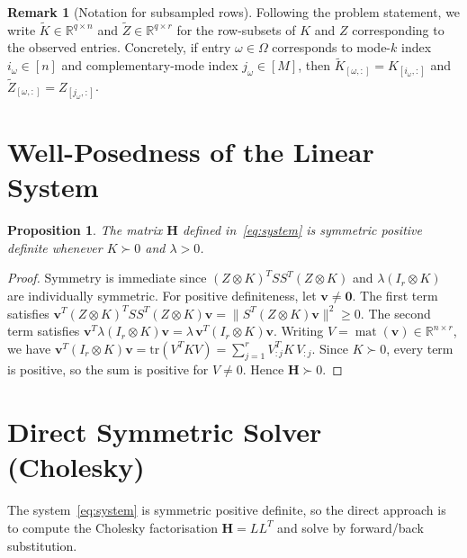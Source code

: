 \documentclass[12pt]{article}
\newtheorem{proposition}[theorem]{Proposition}
\theoremstyle{definition}
\newtheorem{remark}[theorem]{Remark}
\DeclareMathOperator{\mat}{mat}
\newcommand{\R}{\mathbb{R}}
\newcommand{\bH}{\mathbf{H}}
\newcommand{\bv}{\mathbf{v}}
\begin{document}
\begin{remark}[Notation for subsampled rows]
  Following the problem statement, we write $\widetilde{K}\in\R^{q\times n}$ and
  $\widetilde{Z}\in\R^{q\times r}$ for the row-subsets of $K$ and $Z$
  corresponding to the observed entries.  Concretely, if entry $\omega\in\Omega$
  corresponds to mode-$k$ index $i_\omega\in[n]$ and complementary-mode index
  $j_\omega\in[M]$, then
  $\widetilde{K}_{[\omega,:]} = K_{[i_\omega,:]}$ and
  $\widetilde{Z}_{[\omega,:]} = Z_{[j_\omega,:]}$.
\end{remark}

\section{Well-Posedness of the Linear System}

\begin{proposition}\label{prop:spd}
  The matrix $\bH$ defined in~\eqref{eq:system} is symmetric positive definite
  whenever $K\succ 0$ and $\lambda>0$.
\end{proposition}

\begin{proof}
  Symmetry is immediate since $(Z\otimes K)^TSS^T(Z\otimes K)$ and
  $\lambda(I_r\otimes K)$ are individually symmetric.  For positive definiteness,
  let $\bv\neq\mathbf{0}$.  The first term satisfies
  $\bv^T(Z\otimes K)^TSS^T(Z\otimes K)\bv = \|S^T(Z\otimes K)\bv\|^2\geq 0$.
  The second term satisfies
  $\bv^T\lambda(I_r\otimes K)\bv = \lambda\,\bv^T(I_r\otimes K)\bv$.
  Writing $V=\mat(\bv)\in\R^{n\times r}$, we have
  $\bv^T(I_r\otimes K)\bv = \mathrm{tr}(V^TKV) = \sum_{j=1}^r V_{:j}^T K\,V_{:j}$.
  Since $K\succ 0$, every term is positive, so the sum is positive for
  $V\neq 0$.  Hence $\bH\succ 0$.
\end{proof}

\section{Direct Symmetric Solver (Cholesky)}

The system~\eqref{eq:system} is symmetric positive definite, so the direct
approach is to compute the Cholesky factorisation $\bH = LL^T$ and solve by
forward/back substitution.
\end{document}
